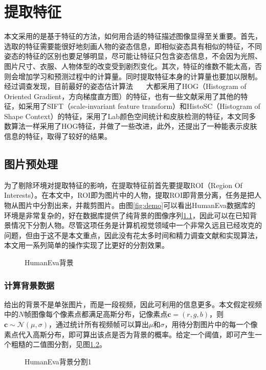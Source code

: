 

\chapter{提取特征}
\label{chap:feature}
本文采用的是基于特征的方法，如何用合适的特征描述图像显得至关重要。首先，选取的特征需要能很好地刻画人物的姿态信息，即相似姿态具有相似的特征，不同姿态的特征的区别也要足够明显，尽可能让特征只包含姿态信息，不会因为光照、图片尺寸、衣服、人物体型的改变受到剧烈变化。其次，特征的维数不能太高，否则会增加学习和预测过程中的计算量。同时提取特征本身的计算量也要加以限制。
经过调查发现，目前最好的姿态估计算法~\cite{ramanan2007learning}~\cite{yang2011articulated}~\cite{tian2012exploring} 大都采用了HOG（Histogram of Oriented Gradient，方向梯度直方图）的特征，也有一些文献采用了其他的特征，如\cite{bo2008fast}采用了SIFT（scale-invariant feature transform）和HistoSC（Histogram of Shape Context）的特征，\cite{eth_biwi_01027}采用了Lab颜色空间统计和皮肤检测的特征，本文同多数算法一样采用了HOG特征，并做了一些改进，此外，还提出了一种能表示皮肤信息的特征，取得了较好的结果。
\section{图片预处理}
为了剔除环境对提取特征的影响，在提取特征前首先要提取ROI（Region Of Interests）。在本文中，ROI即为图片中的人物，提取ROI即背景分离，任务是把人物从图片中分割出来，并裁剪图片。由图\ref{fig:demo}可以看出HumanEva数据库的环境是非常复杂的，好在数据库提供了纯背景的图像序列\ref{fig:background}，因此可以在已知背景情况下分割人物。尽管这项任务是计算机视觉领域中一个非常久远且已经攻克的问题，但由于这不是本文重点，因此没有花太多时间和精力调查文献和实现算法，本文用一系列简单的操作实现了比\cite{Poppe2007}更好的分割效果。
\begin{figure}[htbp]
  \centering
  \caption{HumanEva背景}\label{fig:background}
\end{figure}
\subsection{计算背景数据}
给出的背景不是单张图片，而是一段视频，因此可利用的信息更多。本文假定视频中的$N$帧图像每个像素点都满足高斯分布，记像素点$\mathbf{c}=(r,g,b)$，则$\mathbf{c}\sim \mathcal{N}(\mu,\sigma)$，通过统计所有视频帧可以算出$\mu$和$\sigma$，用待分割图片中的每一个像素点代入高斯分布，即可算出该点是否为背景的概率。给定一个阈值，即可产生一个粗糙的二值图分割，见图\ref{fig:bk1}。
\begin{figure}[htbp]
  \centering
  \hspace{.5cm}
  \caption{HumanEva背景分割1}\label{fig:bk1}
\end{figure}

